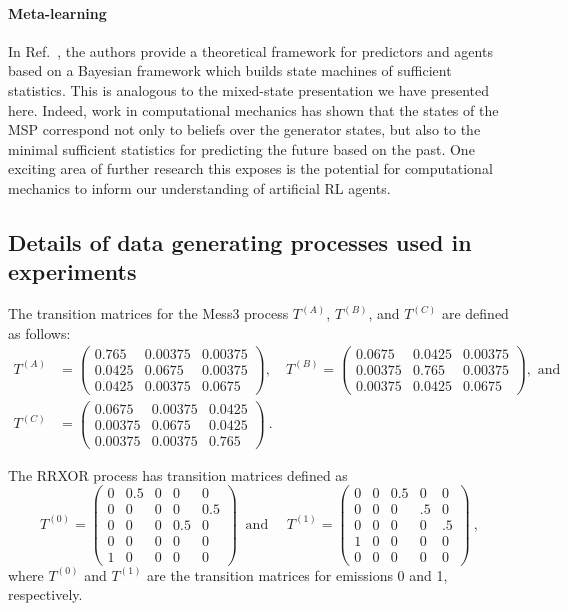 \documentclass{article}
\begin{document}
\paragraph{Meta-learning}
In Ref.~\cite{ortega2019meta}, the authors provide a theoretical framework for predictors and agents based on a Bayesian framework which builds state machines of sufficient statistics. This is analogous to the mixed-state presentation we have presented here. Indeed, work in computational mechanics has shown that the states of the MSP correspond not only to beliefs over the generator states, but also to the minimal sufficient statistics for predicting the future based on the past. One exciting area of further research this exposes is the potential for computational mechanics to inform our understanding of artificial RL agents.

\subsection{Details of data generating processes used in experiments}
The transition matrices for the Mess3 process \(T^{(A)}\), \(T^{(B)}\), and \(T^{(C)}\) are defined as follows:
\begin{align*}
T^{(A)} &=
\begin{pmatrix}
0.765 & 0.00375 & 0.00375 \\
0.0425 & 0.0675 & 0.00375 \\
0.0425 & 0.00375 & 0.0675
\end{pmatrix},
\quad
T^{(B)} =
\begin{pmatrix}
0.0675 & 0.0425 & 0.00375 \\
0.00375 & 0.765 & 0.00375 \\
0.00375 & 0.0425 & 0.0675
\end{pmatrix}, \text{ and}\\
T^{(C)} &=
\begin{pmatrix}
0.0675 & 0.00375 & 0.0425 \\
0.00375 & 0.0675 & 0.0425 \\
0.00375 & 0.00375 & 0.765
\end{pmatrix} ~.
\end{align*}

The RRXOR process has transition matrices defined as
\[
T^{(0)} =
\begin{pmatrix}
0 & 0.5 & 0 & 0 & 0 \\
0 & 0 & 0 & 0 & 0.5 \\
0 & 0 & 0 & 0.5 & 0 \\
0 & 0 & 0 & 0 & 0 \\
1 & 0 & 0 & 0 & 0
\end{pmatrix} ~ \text{ and }
\quad
T^{(1)} =
\begin{pmatrix}
0 & 0 & 0.5 & 0 & 0 \\
0 & 0 & 0 & .5 & 0 \\
0 & 0 & 0 & 0 & .5 \\
1 & 0 & 0 & 0 & 0 \\
0 & 0 & 0 & 0 & 0
\end{pmatrix} ~,
\]
where \( T^{(0)} \) and \( T^{(1)} \) are the transition matrices for emissions 0 and 1, respectively.
\end{document}
